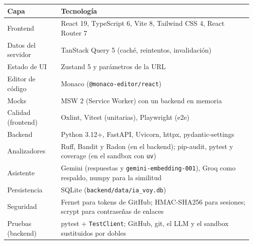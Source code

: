 \documentclass[11pt,a4paper]{article}
\newcommand{\code}[1]{\texttt{\small #1}}
\newcommand{\ruta}[1]{\texttt{\small\color{branddark}#1}}
\begin{document}
\begin{center}
\begin{tabularx}{\linewidth}{@{}lL@{}}
\toprule
\textbf{Capa} & \textbf{Tecnología} \\
\midrule
Frontend & React 19, TypeScript 6, Vite 8, Tailwind CSS 4, React Router 7 \\
Datos del servidor & TanStack Query 5 (caché, reintentos, invalidación) \\
Estado de UI & Zustand 5 y parámetros de la URL \\
Editor de código & Monaco (\code{@monaco-editor/react}) \\
Mocks & MSW 2 (Service Worker) con un backend en memoria \\
Calidad (frontend) & Oxlint, Vitest (unitarias), Playwright (e2e) \\
Backend & Python 3.12+, FastAPI, Uvicorn, httpx, pydantic-settings \\
Analizadores & Ruff, Bandit y Radon (en el backend); pip-audit, pytest y coverage (en el sandbox con \code{uv}) \\
Asistente & Gemini (respuestas y \code{gemini-embedding-001}), Groq como respaldo, numpy para la similitud \\
Persistencia & SQLite (\ruta{backend/data/ia\_voy.db}) \\
Seguridad & Fernet para tokens de GitHub; HMAC-SHA256 para sesiones; scrypt para contraseñas de enlaces \\
Pruebas (backend) & pytest + \code{TestClient}; GitHub, git, el LLM y el sandbox sustituidos por dobles \\
\bottomrule
\end{tabularx}
\end{center}
\end{document}
